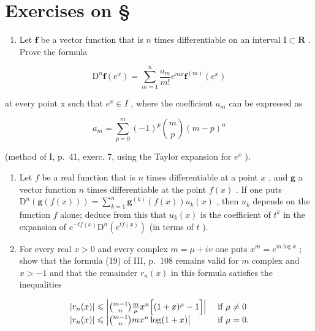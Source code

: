 \section*{Exercises on \S{}}
{}

\begin{enumerate}
\def\labelenumi{\arabic{enumi})}
\tightlist
\item
  Let \(\mathbf{f}\) be a vector function that is \(n\) times differentiable on an interval \(\mathrm{I} \subset \mathbf{R}\) . Prove the formula
\end{enumerate}

\[
\mathrm{D} ^ {n} \mathbf {f} \left(e ^ {x}\right) = \sum_ {m = 1} ^ {n} \frac {a _ {m}}{m !} e ^ {m x} \mathbf {f} ^ {(m)} \left(e ^ {x}\right)
\]

at every point x such that \(e^{x} \in I\) , where the coefficient \(a_{m}\) can be expressed as

\[
a _ {m} = \sum_ {p = 0} ^ {m} (- 1) ^ {p} \binom {m} {p} (m - p) ^ {n}
\]

(method of I, p.~41, exerc. 7, using the Taylor expansion for \(e^{x}\) ).

\begin{enumerate}
\def\labelenumi{\arabic{enumi})}
\setcounter{enumi}{1}
\item
  Let \(f\) be a real function that is \(n\) times differentiable at a point \(x\) , and \(\mathbf{g}\) a vector function \(n\) times differentiable at the point \(f(x)\) . If one puts \(\mathrm{D}^n(\mathbf{g}(f(x))) = \sum_{k=1}^{n} \mathbf{g}^{(k)}(f(x)) u_k(x)\) , then \(u_k\) depends on the function \(f\) alone; deduce from this that \(u_k(x)\) is the coefficient of \(t^k\) in the expansion of \(e^{-tf(x)}\mathrm{D}^n(e^{tf(x)})\) (in terms of \(t\) ).
\item
  For every real \(x > 0\) and every complex \(m = \mu + iv\) one puts \(x^{m} = e^{m\log x}\) ; show that the formula (19) of III, p.~108 remains valid for \(m\) complex and \(x > -1\) and that the remainder \(r_{n}(x)\) in this formula satisfies the inequalities
\end{enumerate}

\[
\begin{array}{l l} | r _ {n} (x) | \leqslant \left| \binom {m - 1} {n} \frac {m}{\mu} x ^ {n} \Big [ (1 + x) ^ {\mu} - 1 \Big ] \right| & \text { if } \mu \neq 0 \\ | r _ {n} (x) | \leqslant \left| \binom {m - 1} {n} m x ^ {n} \log (1 + x) \right| & \text { if } \mu = 0. \end{array}
\]

